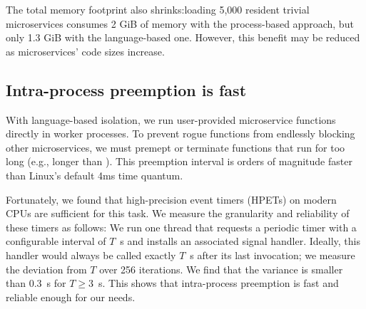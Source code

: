 The total memory footprint also shrinks:\@ loading 5,000 resident
trivial microservices consumes 2 GiB of memory with the process-based approach, but
only 1.3 GiB with the language-based one.  However, this benefit may be reduced as
microservices' code sizes increase.

\subsection{Intra-process preemption is fast}
With language-based isolation, we run user-provided microservice functions
directly in worker processes. To prevent rogue functions from endlessly blocking
other microservices, we must premept or terminate functions that run for too
long (e.g., longer than ).  This preemption interval is orders of
magnitude faster than Linux's default 4ms time quantum.

Fortunately, we found that high-precision event timers (HPETs) on modern CPUs
are sufficient for this task. We measure the granularity and reliability of
these timers as follows: We run one thread that requests a periodic timer with a
configurable interval of $T$~\textmu{}s and installs an associated signal handler.
Ideally, this handler would always be called exactly $T$~\textmu{}s after its last
invocation; we measure the deviation from $T$ over 256 iterations.
We find that the variance
is smaller than 0.3~\textmu{}s for $T \ge 3$~\textmu{}s. This shows that
intra-process preemption is fast and reliable enough for our needs.
